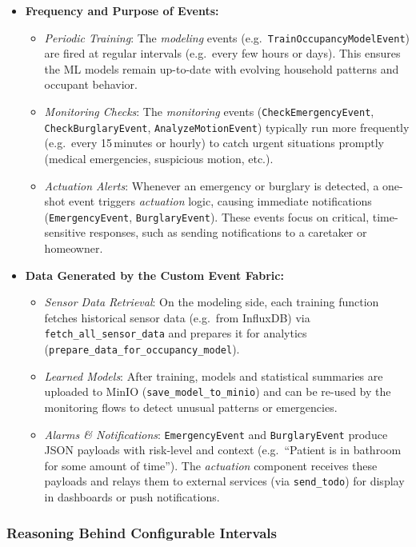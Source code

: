 \documentclass[A4,10pt]{article}
\begin{document}
\begin{itemize}
    \item \textbf{Frequency and Purpose of Events:}
    \begin{itemize}
        \item \emph{Periodic Training}: The \emph{modeling} events (e.g.\ \texttt{TrainOccupancyModelEvent}) are fired at regular intervals (e.g.\ every few hours or days). This ensures the ML models remain up-to-date with evolving household patterns and occupant behavior.
        \item \emph{Monitoring Checks}: The \emph{monitoring} events (\texttt{CheckEmergencyEvent}, \texttt{CheckBurglaryEvent}, \texttt{AnalyzeMotionEvent}) typically run more frequently (e.g.\ every 15\,minutes or hourly) to catch urgent situations promptly (medical emergencies, suspicious motion, etc.).
        \item \emph{Actuation Alerts}: Whenever an emergency or burglary is detected, a one-shot event triggers \emph{actuation} logic, causing immediate notifications (\texttt{EmergencyEvent}, \texttt{BurglaryEvent}). These events focus on critical, time-sensitive responses, such as sending notifications to a caretaker or homeowner.
    \end{itemize}

    \item \textbf{Data Generated by the Custom Event Fabric:}
    \begin{itemize}
        \item \emph{Sensor Data Retrieval}: On the modeling side, each training function fetches historical sensor data (e.g.\ from InfluxDB) via \texttt{fetch\_all\_sensor\_data} and prepares it for analytics (\texttt{prepare\_data\_for\_occupancy\_model}).
        \item \emph{Learned Models}: After training, models and statistical summaries are uploaded to MinIO (\texttt{save\_model\_to\_minio}) and can be re-used by the monitoring flows to detect unusual patterns or emergencies.
        \item \emph{Alarms \& Notifications}: \texttt{EmergencyEvent} and \texttt{BurglaryEvent} produce JSON payloads with risk-level and context (e.g.\ “Patient is in bathroom for some amount of time”). The \textit{actuation} component receives these payloads and relays them to external services (via \texttt{send\_todo}) for display in dashboards or push notifications.
    \end{itemize}
\end{itemize}

\subsubsection*{Reasoning Behind Configurable Intervals}
\end{document}
